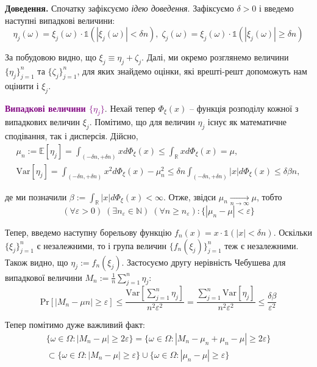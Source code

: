 \documentclass[14pt]{extarticle}
\newcommand{\<}{\langle}
\renewcommand{\>}{\rangle}
\theoremstyle{mystyle}{\newtheorem{definition}{Definition}[section]}
\theoremstyle{mystyle}{\newtheorem{proposition}[definition]{Proposition}}
\theoremstyle{mystyle}{\newtheorem{theorem}[definition]{Theorem}}
\theoremstyle{mystyle}{\newtheorem{lemma}[definition]{Lemma}}
\theoremstyle{mystyle}{\newtheorem{corollary}[definition]{Corollary}}
\theoremstyle{mystyle}{\newtheorem*{remark}{Remark}}
\theoremstyle{mystyle}{\newtheorem*{remarks}{Remarks}}
\theoremstyle{mystyle}{\newtheorem*{example}{Example}}
\theoremstyle{mystyle}{\newtheorem*{examples}{Examples}}
\theoremstyle{definition}{\newtheorem*{exercise}{Exercise}}
\theoremstyle{cstyle}{\newtheorem*{cthm}{}}
\theoremstyle{warn}
\begin{document}
\textbf{Доведення.} Спочатку зафіксуємо \textit{ідею доведення}. Зафіксуємо $\delta>0$ і введемо наступні випадкові величини:
\begin{equation}
    \eta_j(\omega) = \xi_j(\omega) \cdot \mathds{1}(|\xi_j(\omega)| < \delta n), \; \zeta_j(\omega) = \xi_j(\omega) \cdot \mathds{1}(|\xi_j(\omega)|\geq \delta n)
\end{equation}

За побудовою видно, що $\xi_j \equiv \eta_j + \zeta_j$. Далі, ми окремо розглянемо величини
$\{\eta_j\}_{j=1}^n$ та $\{\zeta_j\}_{j=1}^n$, для яких знайдемо оцінки, які врешті-решт допоможуть
нам оцінити і $\xi_j$.

\textcolor{purple}{\textbf{Випадкові величини $\{\eta_j\}$}}. Нехай тепер $\Phi_{\xi}(x)$ -- функція розподілу кожної з випадкових величин $\xi_j$.
Помітимо, що для величин $\eta_j$ існує як математичне сподівання, так і дисперсія. Дійсно,
\begin{gather}
    \mu_n := \mathbb{E}[\eta_j] = \int_{(-\delta n, +\delta n)}x d\Phi_{\xi}(x) \leq \int_{\mathbb{R}}x d\Phi_{\xi}(x) = \mu, \\
    \text{Var}[\eta_j] = \int_{(-\delta n,+\delta n)}x^2d\Phi_{\xi}(x) - \mu_n^2 \leq \delta n\int_{(-\delta n, +\delta n)}|x|d\Phi_{\xi}(x) \leq \delta \beta n,
\end{gather}

де ми позначили $\beta := \int_{\mathbb{R}}|x|d\Phi_{\xi}(x) < \infty$. Отже, звідси $\mu_n \xrightarrow[n \to \infty]{} \mu$, тобто 
\begin{equation}
    (\forall \varepsilon > 0) \; (\exists n_{\varepsilon} \in \mathbb{N}) \; (\forall n \geq n_{\varepsilon}): \{|\mu_n-\mu| < \varepsilon\}
\end{equation}

Тепер, введемо наступну борельову функцію $f_n(x) = x \cdot \mathds{1}(|x| < \delta n)$. Оскільки $\{\xi_j\}_{j=1}^n$ є незалежними, то
і група величин $\{f_n(\xi_j)\}_{j=1}^n$ теж є незалежними. Також видно, що $\eta_j:=f_n(\xi_j)$. Застосуємо другу нерівність Чебушева для 
випадкової величини $M_n := \frac{1}{n}\sum_{j=1}^n\eta_j$:
\begin{equation}
    \text{Pr}\left[\left|M_n - \mu n\right|\geq\varepsilon\right] \leq \frac{\text{Var}\left[\sum_{j=1}^n\eta_j\right]}{n^2\varepsilon^2} = \frac{\sum_{j=1}^n\text{Var}\left[\eta_j\right]}{n^2\varepsilon^2} \leq \frac{\delta \beta}{\varepsilon^2}
\end{equation}

Тепер помітимо дуже важливий факт:
\begin{gather}
    \{\omega \in \Omega: |M_n-\mu| \geq 2\varepsilon\} = \{\omega \in \Omega: |M_n-\mu_n+\mu_n-\mu| \geq 2\varepsilon\} \nonumber \\
    \subset \{\omega \in \Omega: |M_n-\mu| \geq \varepsilon\} \cup \{\omega \in \Omega: |\mu_n-\mu| \geq \varepsilon\}
\end{gather}
\end{document}

